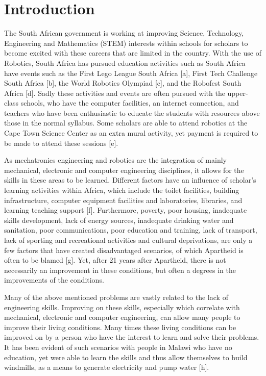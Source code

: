 \documentclass{intech-journal}
\begin{document}
\maketitle

\articleabstract{}
\keywords{}

\section{Introduction}
The South African government is working at improving Science, Technology, Engineering and Mathematics (STEM) interests within schools for scholars to become excited with these careers that are limited in the country. With the use of Robotics, South Africa has pursued education activities such as South Africa have events such as the First Lego League South Africa [a], First Tech Challenge South Africa [b], the World Robotics Olympiad [c], and the Robofest South Africa [d]. Sadly these activities and events are often pursued with the upper-class schools, who have the computer facilities, an internet connection, and teachers who have been enthusiastic to educate the students with resources above those in the normal syllabus. Some scholars are able to attend robotics at the Cape Town Science Center as an extra mural activity, yet payment is required to be made to attend these sessions [e]. 

As mechatronics engineering and robotics are the integration of mainly mechanical, electronic and computer engineering disciplines, it allows for the skills in these areas to be learned. Different factors have an influence of scholar’s learning activities within Africa, which include the toilet facilities, building infrastructure, computer equipment facilities and laboratories,  libraries, and learning teaching support [f]. Furthermore, poverty, poor housing, inadequate skills development, lack of energy sources, inadequate drinking water and sanitation, poor communications, poor education and training, lack of transport, lack of sporting and recreational activities and cultural deprivations, are only a few factors that have created disadvantaged scenarios, of which Apartheid is often to be blamed [g]. Yet, after 21 years after Apartheid, there is not necessarily an improvement in these conditions, but often a degrees in the improvements of the conditions.

Many of the above mentioned problems are vastly related to the lack of engineering skills. Improving on these skills, especially which correlate with mechanical, electronic and computer engineering, can allow many people to improve their living conditions. Many times these living conditions can be improved on by a person who have the interest to learn and solve their problems. It has been evident of such scenarios with people in Malawi who have no education, yet were able to learn the skills and thus allow themselves to build windmills, as a means to generate electricity and pump water [h].
\end{document}
